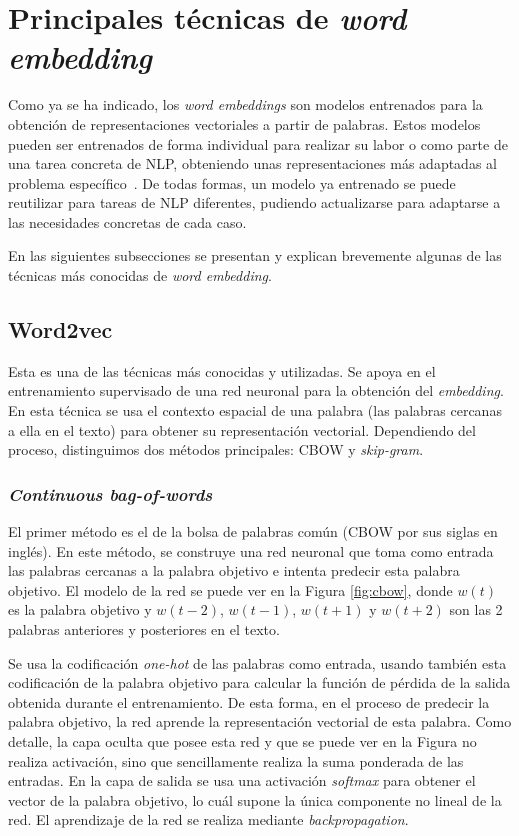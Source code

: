 \section{Principales técnicas de \textit{word embedding}}
\label{sec:techniques}

Como ya se ha indicado, los \textit{word embeddings} son modelos entrenados para
la obtención de representaciones vectoriales a partir de palabras. Estos modelos
pueden ser entrenados de forma individual para realizar su labor o como parte de
una tarea concreta de NLP, obteniendo unas representaciones más adaptadas al
problema específico~\cite{techniques}. De todas formas, un modelo ya entrenado
se puede reutilizar para tareas de NLP diferentes, pudiendo actualizarse para
adaptarse a las necesidades concretas de cada caso.

En las siguientes subsecciones se presentan y explican brevemente algunas de las
técnicas más conocidas de \textit{word embedding}.

\subsection{Word2vec}

Esta es una de las técnicas más conocidas y utilizadas. Se apoya en el
entrenamiento supervisado de una red neuronal para la obtención del
\textit{embedding}. En esta técnica se usa el contexto espacial de una palabra
(las palabras cercanas a ella en el texto) para obtener su representación
vectorial. Dependiendo del proceso, distinguimos dos métodos principales: CBOW y
\textit{skip-gram}.

\subsubsection{\textit{Continuous bag-of-words}}

El primer método es el de la bolsa de palabras común (CBOW por sus siglas en
inglés). En este método, se construye una red neuronal que toma como entrada las
palabras cercanas a la palabra objetivo e intenta predecir esta palabra
objetivo. El modelo de la red se puede ver en la Figura \ref{fig:cbow}, donde
$w(t)$ es la palabra objetivo y $w(t-2)$, $w(t-1)$, $w(t+1)$ y $w(t+2)$ son las
2 palabras anteriores y posteriores en el texto.

Se usa la codificación \textit{one-hot} de las palabras como entrada, usando
también esta codificación de la palabra objetivo para calcular la función de
pérdida de la salida obtenida durante el entrenamiento. De esta forma, en el
proceso de predecir la palabra objetivo, la red aprende la representación
vectorial de esta palabra. Como detalle, la capa oculta que posee esta red y que
se puede ver en la Figura no realiza activación, sino que sencillamente realiza
la suma ponderada de las entradas. En la capa de salida se usa una activación
\textit{softmax} para obtener el vector de la palabra objetivo, lo cuál supone
la única componente no lineal de la red. El aprendizaje de la red se realiza
mediante \textit{backpropagation}.

